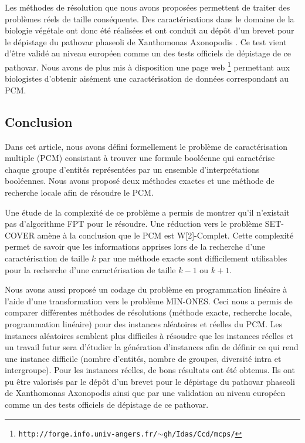 Les méthodes de résolution que nous avons proposées permettent de traiter des problèmes réels de taille conséquente. Des caractérisations dans le domaine de la biologie végétale ont donc été réalisées et ont conduit au dépôt d'un brevet pour le dépistage du pathovar phaseoli de Xanthomonas Axonopodis \cite{Boureau2012}. Ce test vient d'être validé au niveau européen comme un des tests officiels de dépistage de ce pathovar. Nous avons de plus mis à disposition une page web \footnote{\texttt{http://forge.info.univ-angers.fr/$\sim$gh/Idas/Ccd/mcps/}} permettant aux biologistes d'obtenir aisément une caractérisation de données correspondant au PCM.


\subsection{Conclusion}

Dans cet article, nous avons défini formellement le problème de caractérisation multiple (PCM) consistant à trouver une formule booléenne qui caractérise chaque groupe d'entités représentées par un ensemble d'interprétations booléennes. Nous avons proposé deux méthodes exactes et une méthode de recherche locale afin de résoudre le PCM.

Une étude de la complexité de ce problème a permis de montrer qu'il n'existait pas d'algorithme FPT pour le résoudre. Une réduction vers le problème SET-COVER amène à la conclusion que le PCM est W[2]-Complet. Cette complexité permet de savoir que les informations apprises lors de la recherche d'une caractérisation de taille $k$ par une méthode exacte sont difficilement utilisables pour la recherche d'une caractérisation de taille $k-1$ ou $k+1$.

Nous avons aussi proposé un codage du problème en programmation linéaire à l'aide d'une transformation vers le problème MIN-ONES. Ceci nous a permis de comparer différentes méthodes de résolutions (méthode exacte, recherche locale, programmation linéaire) pour des instances aléatoires et réelles du PCM. Les instances aléatoires semblent plus difficiles à résoudre que les instances réelles et un travail futur sera d'étudier la génération d'instances afin de définir ce qui rend une instance difficile (nombre d'entités, nombre de groupes, diversité intra et intergroupe). Pour les instances réelles, de bons résultats ont été obtenus. Ils ont pu être valorisés par le dépôt d'un brevet pour le dépistage du pathovar phaseoli de Xanthomonas Axonopodis ainsi que par une validation au niveau européen comme un des tests officiels de dépistage de ce pathovar. 
